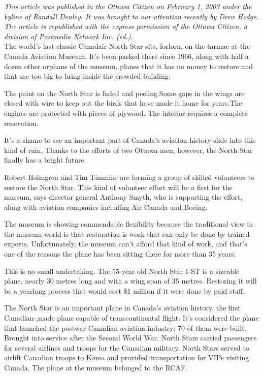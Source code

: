 \begin{multicols}{2}

\textit{This article was published in the Ottawa Citizen on February 1, 2003
under the byline of Randall Denley. It was brought to our attention recently by
Drew Hodge. The article is republished with the express permission of the
Ottawa Citizen, a division of Postmedia Network Inc. (ed.).
}\\

The world's last classic Canadair North Star sits, forlorn, on the tarmac at
the Canada Aviation Museum. It's been parked there since 1966, along with half
a dozen other orphans of the museum, planes that it has no money to restore and
that are too big to bring inside the crowded building.

The paint on the North Star is faded and peeling.Some gaps in the wings are
closed with wire to keep out the birds that have made it home for years.The
engines are protected with pieces of plywood. The interior requires a complete
renovation.

It's a shame to see an important part of Canada's aviation history slide into
this kind of ruin, Thanks to the efforts of two Ottawa men, however, the North
Star finally has a bright future.

Robert Holmgren and Tim Timmins are forming a group of skilled volunteers to
restore the North Star. This kind of volunteer effort will be a first for the
museum, says director general Anthony Smyth, who is supporting the effort,
along with aviation companies including Air Canada and Boeing.

The museum is showing commendable flexibility because the traditional view in
the museum world is that restoration is work that can only be done by trained
experts. Unfortunately, the museum can't afford that kind of work, and that's
one of the reasons the plane has been sitting there for more than 35 years.

This is no small undertaking. The 55-year-old North Star 1-ST is a sizeable
plane, nearly 30 metres long and with a wing span of 35 metres. Restoring it
will be a yearlong process that would cost \$1 million if it were done by paid
staff.

The North Star is an important plane in Canada's aviation history, the first
Canadian-,made plane capable of transcontinental flight. It's considered the
plane that launched the postwar Canadian aviation industry; 70 of them were
built. Brought into service after the Second World War, North Stars carried
passengers for several airlines and troops for the Canadian military.  North
Stars served to airlift Canadian troops to Korea and provided transportation
for VIPs visiting Canada. The plane at the museum belonged to the RCAF.


\end{multicols}
